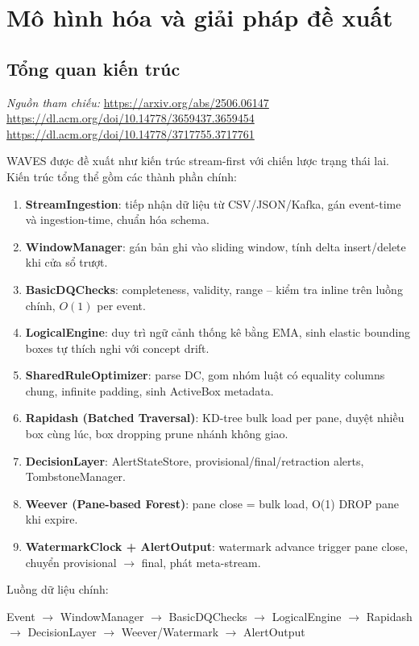 \chapter{Mô hình hóa và giải pháp đề xuất}

\section{Tổng quan kiến trúc}

\noindent\textit{Nguồn tham chiếu:}
\url{https://arxiv.org/abs/2506.06147} \textbar{}
\url{https://dl.acm.org/doi/10.14778/3659437.3659454} \textbar{}
\url{https://dl.acm.org/doi/10.14778/3717755.3717761}

WAVES được đề xuất như kiến trúc stream-first với chiến lược trạng thái lai. Kiến trúc tổng thể gồm các thành phần chính:

\begin{enumerate}
  \item \textbf{StreamIngestion}: tiếp nhận dữ liệu từ CSV/JSON/Kafka, gán event-time và ingestion-time, chuẩn hóa schema.
  \item \textbf{WindowManager}: gán bản ghi vào sliding window, tính delta insert/delete khi cửa sổ trượt.
  \item \textbf{BasicDQChecks}: completeness, validity, range -- kiểm tra inline trên luồng chính, $O(1)$ per event.
  \item \textbf{LogicalEngine}: duy trì ngữ cảnh thống kê bằng EMA, sinh elastic bounding boxes tự thích nghi với concept drift.
  \item \textbf{SharedRuleOptimizer}: parse DC, gom nhóm luật có equality columns chung, infinite padding, sinh ActiveBox metadata.
  \item \textbf{Rapidash (Batched Traversal)}: KD-tree bulk load per pane, duyệt nhiều box cùng lúc, box dropping prune nhánh không giao.
  \item \textbf{DecisionLayer}: AlertStateStore, provisional/final/retraction alerts, TombstoneManager.
  \item \textbf{Weever (Pane-based Forest)}: pane close = bulk load, O(1) DROP pane khi expire.
  \item \textbf{WatermarkClock + AlertOutput}: watermark advance trigger pane close, chuyển provisional $\rightarrow$ final, phát meta-stream.
\end{enumerate}

Luồng dữ liệu chính:
\begin{center}
Event $\rightarrow$ WindowManager $\rightarrow$ BasicDQChecks $\rightarrow$ LogicalEngine $\rightarrow$
Rapidash $\rightarrow$ DecisionLayer $\rightarrow$ Weever/Watermark $\rightarrow$ AlertOutput
\end{center}

